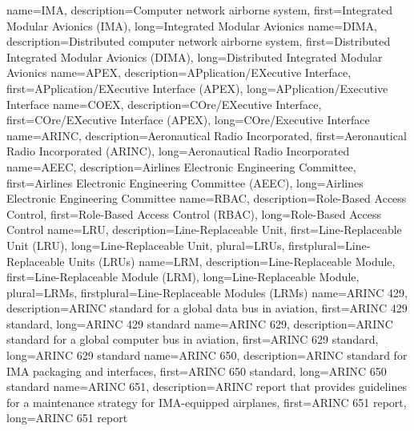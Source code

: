 {%
    name={IMA},
    description={Computer network airborne system},
    first={Integrated Modular Avionics (IMA)},
    long={Integrated Modular Avionics}
}
{%
    name={DIMA},
    description={Distributed computer network airborne system},
    first={Distributed Integrated Modular Avionics (DIMA)},
    long={Distributed Integrated Modular Avionics}
}
{%
    name={APEX},
    description={APplication/EXecutive Interface},
    first={APplication/EXecutive Interface (APEX)},
    long={APplication/Executive Interface}
}
{%
    name={COEX},
    description={COre/EXecutive Interface},
    first={COre/EXecutive Interface (APEX)},
    long={COre/Executive Interface}
}
{%
    name={ARINC},
    description={Aeronautical Radio Incorporated},
    first={Aeronautical Radio Incorporated (ARINC)},
    long={Aeronautical Radio Incorporated}
}
{%
    name={AEEC},
    description={Airlines Electronic Engineering Committee},
    first={Airlines Electronic Engineering Committee (AEEC)},
    long={Airlines Electronic Engineering Committee}
}
{%
    name={RBAC},
    description={Role-Based Access Control},
    first={Role-Based Access Control (RBAC)},
    long={Role-Based Access Control}
}
{%
    name={LRU},
    description={Line-Replaceable Unit},
    first={Line-Replaceable Unit (LRU)},
    long={Line-Replaceable Unit},
    plural={LRUs},
    firstplural={Line-Replaceable Units (LRUs)}
}
{%
    name={LRM},
    description={Line-Replaceable Module},
    first={Line-Replaceable Module (LRM)},
    long={Line-Replaceable Module},
    plural={LRMs},
    firstplural={Line-Replaceable Modules (LRMs)}
}
{%
    name={ARINC 429},
    description={ARINC standard for a global data bus in aviation},
    first={ARINC 429 standard},
    long={ARINC 429 standard}
}
{%
    name={ARINC 629},
    description={ARINC standard for a global computer bus in aviation},
    first={ARINC 629 standard},
    long={ARINC 629 standard}
}
{%
    name={ARINC 650},
    description={ARINC standard for IMA packaging and interfaces},
    first={ARINC 650 standard},
    long={ARINC 650 standard}
}
{%
    name={ARINC 651},
    description={ARINC report that provides guidelines for a maintenance strategy for IMA-equipped airplanes},
    first={ARINC 651 report},
    long={ARINC 651 report}
}
